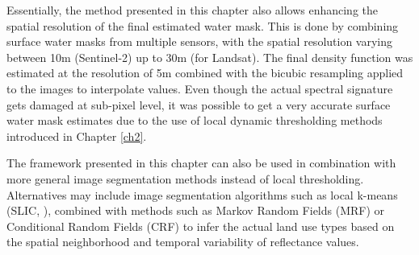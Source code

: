 Essentially, the method presented in this chapter also allows enhancing the spatial resolution of the final estimated water mask. This is done by combining surface water masks from multiple sensors, with the spatial resolution varying between 10m (Sentinel-2) up to 30m (for Landsat). The final density function was estimated at the resolution of 5m combined with the bicubic resampling applied to the images to interpolate values. Even though the actual spectral signature gets damaged at sub-pixel level, it was possible to get a very accurate surface water mask estimates due to the use of local dynamic thresholding methods introduced in Chapter \ref{ch2}.

The framework presented in this chapter can also be used in combination with more general image segmentation methods instead of local thresholding. Alternatives may include image segmentation algorithms such as local k-means (SLIC, \citet{achanta2012slic}), combined with methods such as Markov Random Fields (MRF) or Conditional Random Fields (CRF) to infer the actual land use types based on the spatial neighborhood and temporal variability of reflectance values.
